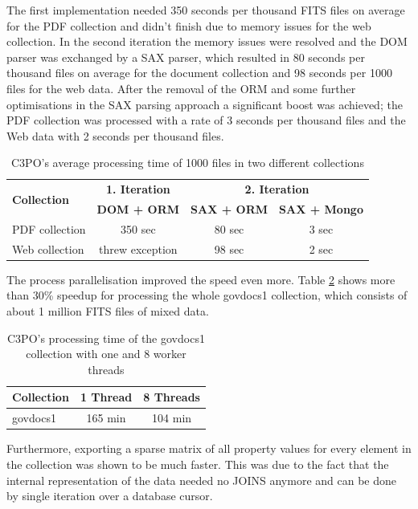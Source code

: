 The first implementation needed 350 seconds per thousand FITS files on average for the PDF collection and didn't finish due to memory issues for the web collection. In the second iteration the memory issues were resolved and the DOM parser was exchanged by a SAX parser, which resulted in 80 seconds per thousand files on average for the document collection and 98 seconds per 1000 files for the web data. After the removal of the ORM and some further optimisations in the SAX parsing approach a significant boost was achieved; the PDF collection was processed with a rate of 3 seconds per thousand files and the Web data with 2 seconds per thousand files.

\begin{table}[h]
\centering
\begin{tabular}{l || c | c | c}
\hline
\multirow{2}{*}{\textbf{Collection}} &  \textbf{1. Iteration} & \multicolumn{2}{c}{\textbf{2. Iteration}} \\
                    & \textbf{DOM + ORM} & \textbf{SAX + ORM} & \textbf{SAX + Mongo} \\
\hline
PDF collection & 350 sec  & 80 sec & 3 sec \\
\hline
Web collection & threw exception & 98 sec & 2 sec \\
\hline
\end{tabular}
\caption{C3PO's average processing time of 1000 files in two different collections}
\label{tab:iterations_performance_metrics}
\end{table}

The process parallelisation improved the speed even more. Table \ref{tab:parallel_performance_metrics} shows
more than 30\% speedup for processing the whole govdocs1 collection, which consists of about 1 million FITS files of mixed data.

\begin{table}[h]
\centering
\begin{tabular}{l || c | c}
\hline
\textbf{Collection} & \textbf{1 Thread} & \textbf{8 Threads} \\
\hline
govdocs1 & 165 min & 104 min \\
\hline
\end{tabular}
\caption{C3PO's processing time of the govdocs1 collection with one and 8 worker threads}
\label{tab:parallel_performance_metrics}
\end{table}

Furthermore, exporting a sparse matrix of all property values for every element in the collection was shown to be much faster. This was due to the fact that the internal representation of the data needed no JOINS anymore and can be done by single iteration over a database cursor.

